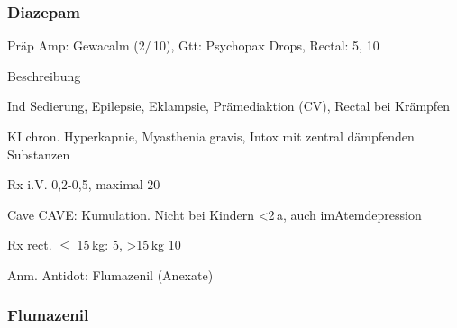 \subsubsection{Diazepam}
\begin{labeling}[:]{mm}
  \item[Präp] Amp: Gewacalm (2\Ml*/\,10\Mg*), Gtt: Psychopax Drops,
  Rectal: 5\Mg, 10\Mg
  \item[Beschreibung]
  \item[Ind] Sedierung, Epilepsie, Eklampsie, Prämediaktion (CV), Rectal bei
  Krämpfen
  \item[KI] chron. Hyperkapnie, Myasthenia gravis, Intox mit
zentral dämpfenden Substanzen
\item[Rx i.V.]  0,2-0,5\MgKg*, maximal 20\Mg
\item[Cave] CAVE: Kumulation. Nicht bei Kindern {\textless}2\,a, auch
imAtemdepression
\item[Rx rect.] $\leq$ 15\,kg: 5\Mg, {\textgreater}15\,kg 10\Mg
\item[Anm.] Antidot: Flumazenil (Anexate)

\end{labeling}


\subsubsection{Flumazenil}





